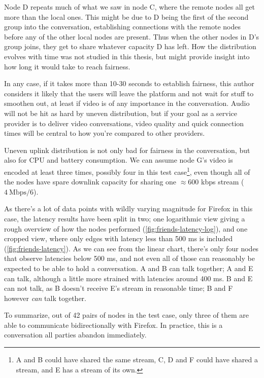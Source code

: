 Node D repeats much of what we saw in node C, where the remote nodes all get more than the local ones. This might be due to D being the first of the second group into the conversation, establishing connections with the remote nodes before any of the other local nodes are present. Thus when the other nodes in D's group joins, they get to share whatever capacity D has left. How the distribution evolves with time was not studied in this thesis, but might provide insight into how long it would take to reach fairness.

In any case, if it takes more than 10-30 seconds to establish fairness, this author considers it likely that the users will leave the platform and not wait for stuff to smoothen out, at least if video is of any importance in the conversation. Audio will not be hit as hard by uneven distribution, but if your goal as a service provider is to deliver video conversations, video quality and quick connection times will be central to how you're compared to other providers.

Uneven uplink distribution is not only bad for fairness in the conversation, but also for CPU and battery consumption. We can assume node G's video is encoded at least three times, possibly four in this test case\footnote{A and B could have shared the same stream, C, D and F could have shared a stream, and E has a stream of its own.}, even though all of the nodes have spare downlink capacity for sharing one $\approx$600 kbps stream ($4~\text{Mbps}/6$).

As there's a lot of data points with wildly varying magnitude for Firefox in this case, the latency results have been split in two; one logarithmic view giving a rough overview of how the nodes performed (\autoref{fig:friends-latency-log}), and one cropped view, where only edges with latency less than 500 ms is included (\autoref{fig:friends-latency}). As we can see from the linear chart, there's only four nodes that observe latencies below 500 ms, and not even all of those can reasonably be expected to be able to hold a conversation. A and B can talk together; A and E can talk, although a little more strained with latencies around 400 ms. B and E can not talk, as B doesn't receive E's stream in reasonable time; B and F however \emph{can} talk together.

To summarize, out of 42 pairs of nodes in the test case, only three of them are able to communicate bidirectionally with Firefox. In practice, this is a conversation all parties abandon immediately.

